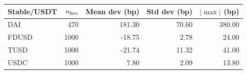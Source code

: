 \begin{tabular}{@{}lrrrr@{}}
\toprule
Stable/USDT & $n_{\rm hrs}$ & Mean dev (bp) & Std dev (bp) & $|\!\max\!|$ (bp) \\
\midrule
DAI & 470 & 181.30 & 70.60 & 380.00 \\
FDUSD & 1000 & -18.75 & 2.78 & 24.00 \\
TUSD & 1000 & -21.74 & 11.32 & 41.00 \\
USDC & 1000 & 7.80 & 2.09 & 13.80 \\
\bottomrule
\end{tabular}